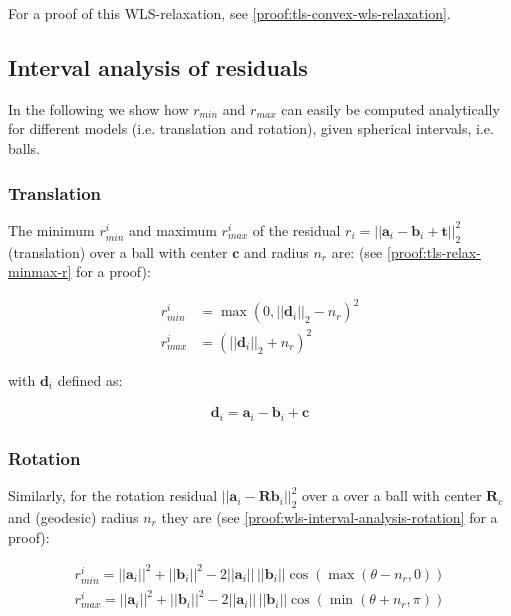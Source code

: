 For a proof of this WLS-relaxation, see \ref{proof:tls-convex-wls-relaxation}.

\subsection{Interval analysis of residuals}

In the following we show how $r_{min}$ and $r_{max}$ can easily be computed analytically for different models (i.e. translation and rotation), given spherical intervals, i.e. balls.

\subsubsection{Translation}
The minimum $r_{min}^i$ and maximum $r_{max}^i$ of the residual $r_i =||\mathbf{a}_i - \mathbf{b}_i + \mathbf{t}||_2^2$ (translation) over a ball with center $\mathbf{c}$ and radius $n_r$ are: (see \ref{proof:tls-relax-minmax-r} for a proof):

\begin{equation}
	\begin{aligned}	
		r_{min}^i &= \max(0, ||\mathbf{d}_i||_2 - n_r)^2\\
		r_{max}^i &= (||\mathbf{d}_i||_2 + n_r)^2
	\end{aligned}
\end{equation}

with $\mathbf{d}_i$ defined as: 

\begin{equation}
	\begin{aligned}	
		\mathbf{d}_i = \mathbf{a}_i - \mathbf{b}_i + \mathbf{c}
	\end{aligned}
\end{equation}

\subsubsection{Rotation}

Similarly, for the rotation residual $||\mathbf{a}_i - \mathbf{R}\mathbf{b}_i ||_2^2$ over a over a ball with center $\mathbf{R}_c$ and (geodesic) radius $n_r$ they are (see \ref{proof:wls-interval-analysis-rotation} for a proof): 

\begin{equation}
	\label{eq:residual-minmax-rotation}
	\begin{aligned}
		r_{min}^i = ||\mathbf{a}_i||^2 + ||\mathbf{b}_i||^2 - 2 ||\mathbf{a}_i|| \, ||\mathbf{b}_i|| \cos (\max(\theta - n_r, 0))\\
		r_{max}^i = ||\mathbf{a}_i||^2 + ||\mathbf{b}_i||^2 - 2 ||\mathbf{a}_i|| \, ||\mathbf{b}_i|| \cos (\min(\theta + n_r, \pi))
	\end{aligned}
\end{equation}

